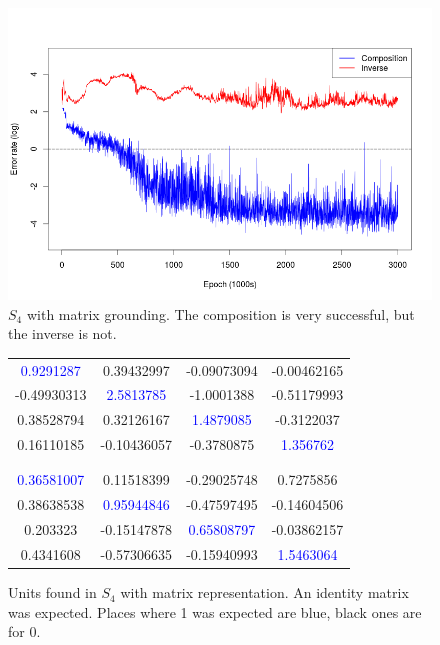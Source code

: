 \begin{figure}
\center
\caption{$S_4$ with matrix grounding. The composition is very successful, but the inverse is not.}
\label{graph:s4_matrix}
\includegraphics[width=\linewidth]{../img/s4_matrix.png}
\end{figure}

\begin{figure}
\center
\caption{Units found in $S_4$ with matrix representation. An identity matrix was expected. Places where 1 was expected are blue, black ones are for 0.}
\label{table:s4_matrix_unit}
\begin{tabular}{cccc}
\textcolor{blue}{0.9291287} & 0.39432997 & -0.09073094 & -0.00462165\\
-0.49930313 & \textcolor{blue}{2.5813785} & -1.0001388 & -0.51179993\\
0.38528794 & 0.32126167 & \textcolor{blue}{1.4879085} & -0.3122037\\
0.16110185 & -0.10436057 & -0.3780875 & \textcolor{blue}{1.356762}\\
 \\
\hline
\\
 \textcolor{blue}{0.36581007} & 0.11518399 & -0.29025748  & 0.7275856\\
0.38638538 & \textcolor{blue}{0.95944846} & -0.47597495 & -0.14604506\\
0.203323 & -0.15147878 & \textcolor{blue}{0.65808797} & -0.03862157\\
0.4341608 & -0.57306635 & -0.15940993 & \textcolor{blue}{1.5463064}
\end{tabular}
\end{figure}

